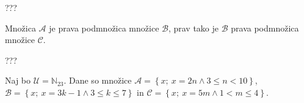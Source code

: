 \documentclass[addpoints,12pt]{exam}
\begin{document}
\begin{questions}


    \begin{solution}[9cm]
???
    \end{solution}


    \newpage

    \question
    Množica $\mathcal{A}$ je prava podmnožica množice $\mathcal{B}$, prav tako je $\mathcal{B}$ prava podmnožica množice $\mathcal{C}$.

    \begin{solution}[1cm]
???
    \end{solution}




    \newpage

    \question
    Naj bo $\mathcal{U}=\mathbb{N}_{23}$. Dane so množice $\mathcal{A}=\left\{x;\ x=2n \land 3\leq n<10\right\}$, \\ $\mathcal{B}=\left\{x;\ x=3k-1 \land 3\leq k\leq 7\right\}$ in $\mathcal{C}=\left\{x;\ x=5m \land 1<m\leq 4\right\}$. 
    \begin{parts}

\end{parts}
\end{questions}
\end{document}
